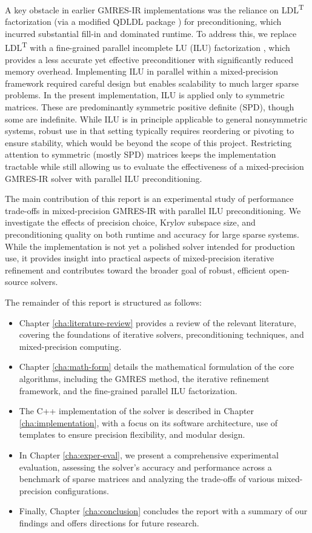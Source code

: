 A key obstacle in earlier GMRES-IR implementations was the reliance on
LDL\textsuperscript{T} factorization (via a modified QDLDL package
\cite{shahrooz_derakhshan_using_2023}) for preconditioning, which incurred
substantial fill-in and dominated runtime. To address this, we replace
LDL\textsuperscript{T} with a fine-grained parallel incomplete LU (ILU)
factorization \cite{chow_fine-grained_2015}, which provides a less accurate yet
effective preconditioner with significantly reduced memory overhead.
Implementing ILU in parallel within a mixed-precision framework required careful
design but enables scalability to much larger sparse problems. In the present
implementation, ILU is applied only to symmetric matrices. These are
predominantly symmetric positive definite (SPD), though some are indefinite.
While ILU is in principle applicable to general nonsymmetric systems, robust use
in that setting typically requires reordering or pivoting to ensure stability,
which would be beyond the scope of this project. Restricting attention to
symmetric (mostly SPD) matrices keeps the implementation tractable while still
allowing us to evaluate the effectiveness of a mixed-precision GMRES-IR solver
with parallel ILU preconditioning.

The main contribution of this report is an experimental study of performance
trade-offs in mixed-precision GMRES-IR with parallel ILU preconditioning. We
investigate the effects of precision choice, Krylov subspace size, and
preconditioning quality on both runtime and accuracy for large sparse systems.
While the implementation is not yet a polished solver intended for production
use, it provides insight into practical aspects of mixed-precision iterative
refinement and contributes toward the broader goal of robust, efficient
open-source solvers.

The remainder of this report is structured as follows:

\begin{itemize}
\item Chapter \ref{cha:literature-review} provides a review of the relevant
  literature, covering the foundations of iterative solvers, preconditioning
  techniques, and mixed-precision computing.
\item Chapter \ref{cha:math-form} details the mathematical formulation of the core
  algorithms, including the GMRES method, the iterative refinement framework,
  and the fine-grained parallel ILU factorization.
\item The C++ implementation of the solver is described in Chapter
  \ref{cha:implementation}, with a focus on its software architecture, use of
  templates to ensure precision flexibility, and modular design.
\item In Chapter \ref{cha:exper-eval}, we present a comprehensive experimental
  evaluation, assessing the solver’s accuracy and performance across a benchmark
  of sparse matrices and analyzing the trade-offs of various mixed-precision
  configurations.
\item Finally, Chapter \ref{cha:conclusion} concludes the report with a summary of our
  findings and offers directions for future research.
\end{itemize}
